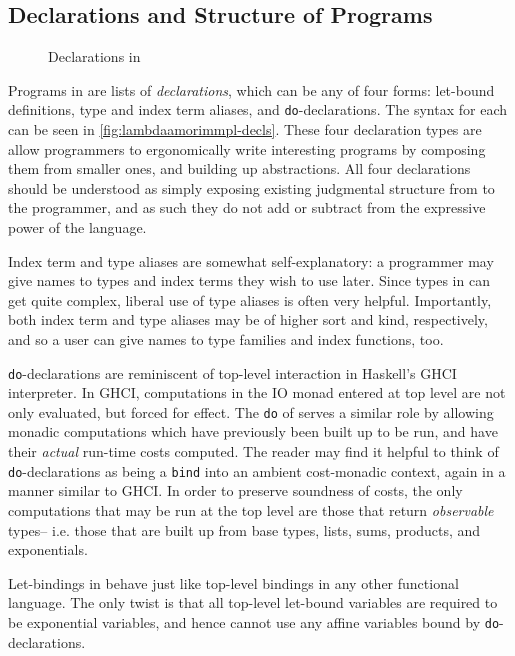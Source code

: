\subsection{Declarations and Structure of \lambdaamorimpl Programs}
\begin{figure}

\caption{Declarations in \lambdaamorimpl}
\label{fig:lambdaamorimmpl-decls}
\end{figure}

Programs in \lambdaamorimpl are lists of \textit{declarations}, which can be any of four forms: let-bound definitions, type and index term aliases, and \texttt{do}-declarations. The syntax for each can be seen in \autoref{fig:lambdaamorimmpl-decls}. These four declaration types are allow programmers to ergonomically write interesting programs by composing them from smaller ones, and building up abstractions. All four declarations should be understood as simply exposing existing judgmental structure from \dlambdaamor to the programmer, and as such they do not add or subtract from the expressive power of the language.

Index term and type aliases are somewhat self-explanatory: a programmer may give names to types and index terms they wish to use later. Since types in \lambdaamorimpl can get quite complex, liberal use of type aliases is often very helpful. Importantly, both index term and type aliases may be of higher sort and kind, respectively, and so a user can give names to type families and index functions, too.

\texttt{do}-declarations are reminiscent of top-level interaction in Haskell's GHCI interpreter. In GHCI, computations in the IO monad entered at top level are not only evaluated, but forced for effect. The \texttt{do} of \lambdaamorimpl serves a similar role by allowing monadic computations which have previously been built up to be run, and have their \textit{actual} run-time costs computed. The reader may find it helpful to think of \texttt{do}-declarations as being a \texttt{bind} into an ambient cost-monadic context, again in a manner similar to GHCI. In order to preserve soundness of costs, the only computations that may be run at the top level are those that return \textit{observable} types-- i.e. those that are built up from base types, lists, sums, products, and exponentials.

Let-bindings in \lambdaamorimpl behave just like top-level bindings in any other functional language. The only twist is that all top-level let-bound variables are required to be exponential variables, and hence cannot use any affine variables bound by \texttt{do}-declarations.


